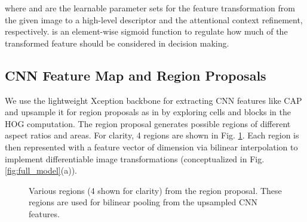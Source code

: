\documentclass[journal]{IEEEtran}
\begin{document}
where  and  are the learnable parameter sets for the feature transformation from the given image  to a high-level descriptor and the attentional context refinement, respectively.  is an element-wise sigmoid function to regulate how much of the transformed feature should be considered in decision making. 
\vspace{-0.5 cm}
\subsection{CNN Feature Map and Region Proposals}\label{sec:roi}
We use the lightweight Xception \cite{chollet2017xception} backbone for extracting CNN features like CAP \cite{behera2021context} 
and upsample it for region proposals as in \cite{behera2020regional} by exploring cells and blocks in the HOG computation. The region proposal generates  possible regions of different aspect ratios and areas. For clarity, 4 regions are shown in Fig. \ref{fig:regions}. Each region is then represented with a feature vector  of dimension  via bilinear interpolation to implement differentiable image transformations (conceptualized in Fig. \ref{fig:full_model}(a)).

\begin{figure}[t]
\vspace{-0.5 cm}
\renewcommand*\thesubfigure{\arabic{subfigure}}
    \centering
    \hfill
        \hfill
            \hfill
    \caption{Various regions (4 shown for clarity) from the region proposal. These regions are used for bilinear pooling from the upsampled CNN features. }
    \label{fig:regions}
\vspace{-0.3 cm}    
\end{figure}
\vspace{-0.2 cm}
\end{document}
